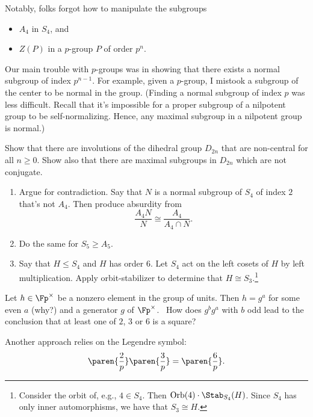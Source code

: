 \begin{note}
    Notably, folks forgot how to manipulate the subgroups 
    \begin{itemize}
        \item $A_4$ in $S_4$, and
        \item $Z(P)$ in a $p$-group $P$ of order $p^n$.
    \end{itemize}
    Our main trouble with $p$-groups was in showing that there exists a normal subgroup of index $p^{n-1}$. 
    For example, given a $p$-group, I mistook a subgroup of the center to be normal in the group. 
    (Finding a normal subgroup of index $p$ was less difficult. Recall that it's impossible for a proper subgroup of a nilpotent group to be self-normalizing. Hence, any maximal subgroup in a nilpotent group is normal.)
\end{note}

\begin{todo}[]
    Show that there are involutions of the dihedral group $D_{2n}$ that are non-central for all $n \ge 0$. Show also that there are maximal subgroups in $D_{2n}$ which are not conjugate.
\end{todo}

\begin{todo}[]
    \begin{enumerate}
        \item Argue for contradiction. Say that $N$ is a normal subgroup of $S_4$ of index $2$ that's not $A_4$. Then produce absurdity from 
              \begin{equation*}
                 \frac{A_4 N}{N} \cong \frac{A_4}{A_4 \cap N}.
              \end{equation*}
        \item Do the same for $S_5 \ge A_5$.
        \item Say that $H \le S_4$ and $H$ has order $6$. 
         Let $S_4$ act on the left cosets of $H$ by left multiplication.
        Apply orbit-stabilizer to determine that $H \cong S_3$.\footnote{Consider the orbit of, e.g., $4 \in S_4$. Then $\mathrm{Orb} (4) \cdot \Stab_{S_4} (H)$. Since $S_4$ has only inner automorphisms, we have that $S_3 \cong H$. }
    \end{enumerate}
\end{todo}

\begin{todo}
    Let $h \in \Fp^\times$ be a nonzero element in the group of units.
    Then $h = g^a$ for some even $a$ (why?) and a generator $g$ of $\Fp^\times$.
    \TODO\ How does $g^b g^a$ with $b$ odd lead to the conclusion that at least one of $2$, $3$ or $6$ is a square?

    Another approach relies on the Legendre symbol:
    \begin{equation*}
        \paren{\frac{2}{p}}\paren{\frac{3}{p}}  = \paren{\frac{6}{p}}.
    \end{equation*}
\end{todo}

